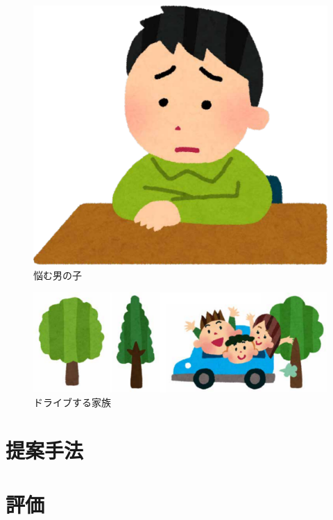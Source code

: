 \documentclass[a4paper,10pt,twocolumn,uplatex]{jsarticle}
\begin{document}
\begin{figure}[!tb]
  \centering
  \includegraphics[width=\linewidth]{img/sample1.pdf}
  \caption{悩む男の子}
  \label{fig:sample1}
\end{figure}

\begin{figure}[!tb]
  \centering
  \includegraphics[width=\linewidth]{img/sample2.pdf}
  \caption{ドライブする家族}
  \label{fig:sample2}
\end{figure}

\section{提案手法}

\section{評価}
\end{document}
